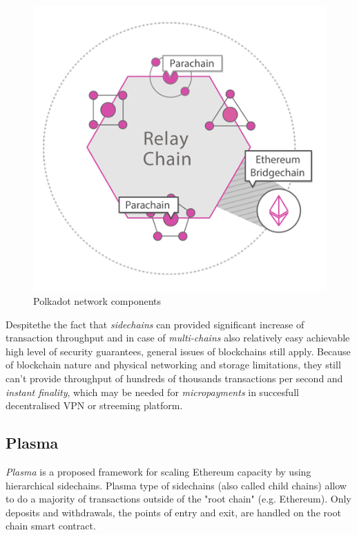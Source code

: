 \documentclass[a4paper,12pt]{article}
\begin{document}
\begin{figure}[H]
    \centering
    \includegraphics[scale=0.5]{img/polkadot}
    \caption{Polkadot network components}
    \label{img:polkadot}
\end{figure}

Despitethe the fact that \textit{sidechains} can provided significant increase 
of transaction throughput and in case of \textit{multi-chains} also relatively
easy achievable high level of security guarantees, general issues of blockchains
still apply. Because of blockchain nature and physical networking and storage 
limitations, they still can't provide throughput of hundreds of thousands 
transactions per second and \textit{instant finality}, which may be needed for 
\textit{micropayments} in succesfull decentralised VPN or streeming platform.

\subsection{Plasma}

\textit{Plasma} \cite{plasma} is a proposed framework for scaling Ethereum 
capacity by using hierarchical sidechains. Plasma type of sidechains (also 
called child chains) allow to do a majority of transactions outside of the "root
chain" (e.g. Ethereum). Only deposits and withdrawals, the points of entry and 
exit, are handled on the root chain smart contract.
\end{document}

